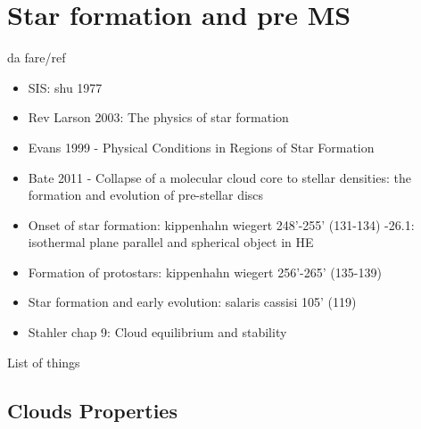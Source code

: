 \section{Star formation and pre MS}

\begin{wordonframe}{da fare/ref}
\begin{itemize}
    \item SIS: shu 1977
    \item Rev Larson 2003: The physics of star formation
    \item Evans 1999 - Physical Conditions in Regions of Star Formation
    \item Bate 2011 - Collapse of a molecular cloud core to stellar densities: the formation and evolution of pre-stellar discs
    \item Onset of star formation: kippenhahn wiegert 248'-255' (131-134) -26.1: isothermal plane parallel and spherical object in HE
    \item Formation of protostars: kippenhahn wiegert 256'-265' (135-139)
    \item Star formation and early evolution: salaris cassisi 105' (119)
        \item Stahler chap 9: Cloud equilibrium and stability
\end{itemize}
\end{wordonframe}


\begin{frame}[allowframebreaks]{List of things}
\listoftodos
\end{frame}

\subsection{Clouds Properties}

